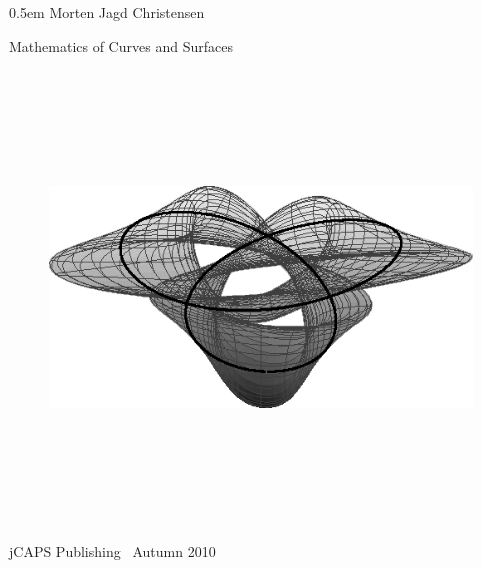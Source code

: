 \documentclass[a4paper,openany,10pt]{memoir}
\theoremstyle{remark} %
\begin{document}
\enlargethispage{3\baselineskip}
\thispagestyle{empty}
{
\pagecolor[HTML]{660066}
\color{white}\Large\bfseries

\vspace*{\droptitle}
\begin{flushright} \Large \lineskip 0.5em
     Morten Jagd Christensen \par
\end{flushright}

\begin{center} \HUGE \sffamily
Mathematics of Curves and Surfaces
  \par 
\end{center}

\vspace{2cm}

%

  \begin{figure}[htb]
    \begin{center}
      \includegraphics[width=12cm,height=12cm]{figures/trefoil}
    \end{center}
  \end{figure}

\vspace*{\baselineskip}

\begin{center}
  \Large \textsf{jCAPS Publishing \textbullet\ Autumn 2010}
\end{center}
}
\end{document}
